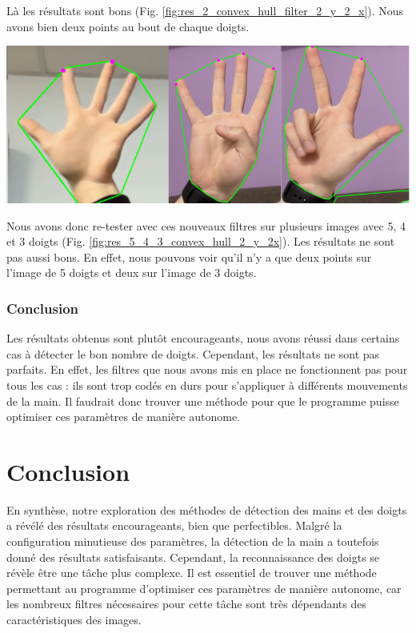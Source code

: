 \documentclass[11pt]{article}
\begin{document}
Là les résultats sont bons (Fig. \ref{fig:res_2_convex_hull_filter_2_y_2_x}). Nous avons bien deux points au bout de chaque doigts. \bigbreak

\begin{center}
    \includegraphics[width=\textwidth]{images/res_5_4_3_convex_hull_2_y_2x.png}
    \label{fig:res_5_4_3_convex_hull_2_y_2x}
\end{center}

Nous avons donc re-tester avec ces nouveaux filtres sur plusieurs images avec 5, 4 et 3 doigts (Fig. \ref{fig:res_5_4_3_convex_hull_2_y_2x}). Les résultats ne sont pas aussi bons. En effet, nous pouvons voir qu'il n'y a que deux points sur l'image de 5 doigts et deux sur l'image de 3 doigts. 

\subsubsection{Conclusion}
Les résultats obtenus sont plutôt encourageants, nous avons réussi dans certains cas à détecter le bon nombre de doigts. Cependant, les résultats ne sont pas parfaits. En effet, les filtres que nous avons mis en place ne fonctionnent pas pour tous les cas : ils sont trop codés en durs pour s'appliquer à différents mouvements de la main. Il faudrait donc trouver une méthode pour que le programme puisse optimiser ces paramètres de manière autonome.

\section*{Conclusion}
En synthèse, notre exploration des méthodes de détection des mains et des doigts a révélé des résultats encourageants, bien que perfectibles. Malgré la configuration minutieuse des paramètres, la détection de la main a toutefois donné des résultats satisfaisants. Cependant, la reconnaissance des doigts se révèle être une tâche plus complexe. Il est essentiel de trouver une méthode permettant au programme d'optimiser ces paramètres de manière autonome, car les nombreux filtres nécessaires pour cette tâche sont très dépendants des caractéristiques des images. \bigbreak
\end{document}

